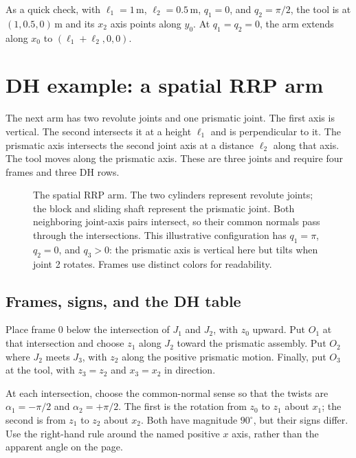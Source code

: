 As a quick check, with $\ell_1=1\,\mathrm m$, $\ell_2=0.5\,\mathrm m$,
$q_1=0$, and $q_2=\pi/2$, the tool is at
$(1,0.5,0)\,\mathrm m$ and its $x_2$ axis points along $y_0$.
At $q_1=q_2=0$, the arm extends along $x_0$ to
$(\ell_1+\ell_2,0,0)$.

\section{DH example: a spatial RRP arm}
\label{sec:l10-dh-rrp}
The next arm has two revolute joints and one prismatic joint. The first
axis is vertical. The second intersects it at a height $\ell_1$ and is
perpendicular to it. The prismatic axis intersects the second joint axis
at a distance $\ell_2$ along that axis. The tool moves along the prismatic
axis. These are three joints and require four frames and three DH rows.

\begin{figure}[htbp]
\centering
\caption{The spatial RRP arm. The two cylinders represent revolute joints;
the block and sliding shaft represent the prismatic joint. Both neighboring
joint-axis pairs intersect, so their common normals pass through the
intersections. This illustrative configuration has $q_1=\pi$, $q_2=0$,
and $q_3>0$: the prismatic axis is vertical here but tilts when joint 2
rotates. Frames use distinct colors for readability.}
\label{fig:l10-dh-rrp}
\end{figure}

\subsection{Frames, signs, and the DH table}
Place frame 0 below the intersection of $J_1$ and $J_2$, with $z_0$
upward. Put $O_1$ at that intersection and choose $z_1$ along $J_2$
toward the prismatic assembly. Put $O_2$ where $J_2$ meets $J_3$, with
$z_2$ along the positive prismatic motion. Finally, put $O_3$ at the tool,
with $z_3=z_2$ and $x_3=x_2$ in direction.

At each intersection, choose the common-normal sense so that the twists
are $\alpha_1=-\pi/2$ and $\alpha_2=+\pi/2$. The first is the rotation
from $z_0$ to $z_1$ about $x_1$; the second is from $z_1$ to $z_2$ about
$x_2$. Both have magnitude $90^\circ$, but their signs differ. Use the
right-hand rule around the named positive $x$ axis, rather than the
apparent angle on the page.

